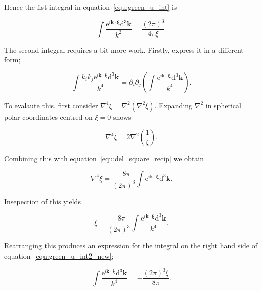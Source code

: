 \documentclass[12pt]{article}
\begin{document}
Hence the fist integral in equation~\ref{equ:green_u_int} is

\begin{equation}
\label{equ:green_u_int1}
\int \frac{\mathrm{e}^{i \boldsymbol{k} \cdot \boldsymbol{\xi}} \mathrm{d}^{3} \boldsymbol{k}}{k^{2}} = \frac{(2 \pi)^{3}}{4 \pi \xi} .
\end{equation}

The second integral requires a bit more work. Firstly, express it in a different form;

\begin{equation}
\label{equ:green_u_int2_new}
\int \frac{k_{i} k_{j} \mathrm{e}^{i \boldsymbol{k} \cdot \boldsymbol{\xi}} \mathrm{d}^{3} \boldsymbol{k}}{k^{4}} = \partial_{i} \partial_{j} \left(\int \frac{\mathrm{e}^{i \boldsymbol{k} \cdot \boldsymbol{\xi}} \mathrm{d}^{3} \boldsymbol{k}}{k^{4}} \right) .
\end{equation}

To evalaute this, first consider $\nabla^{4} \xi = \nabla^{2}(\nabla^{2} \xi)$. Expanding $\nabla^{2}$ in spherical polar coordinates centred on $\xi = 0$ shows

\begin{equation}
\label{equ:del4}
\nabla^{4} \xi = 2 \nabla^{2} \left(\frac{1}{\xi}\right) .
\end{equation}

Combining this with equation~\ref{equ:del_square_recip} we obtain

\begin{equation}
\label{equ:del4_int}
\nabla^{4} \xi = \frac{-8 \pi}{(2 \pi)^{3}} \int \mathrm{e}^{i \boldsymbol{k} \cdot \boldsymbol{\xi}} \mathrm{d}^{3} \boldsymbol{k} .
\end{equation}

Insepection of this yields

\begin{equation}
\label{equ:del4_int_int}
\xi = \frac{-8 \pi}{(2 \pi)^{3}} \int \frac{\mathrm{e}^{i \boldsymbol{k} \cdot \boldsymbol{\xi}} \mathrm{d}^{3} \boldsymbol{k}}{k^{4}} .
\end{equation}

Rearranging this produces an expression for the integral on the right hand side of equation~\ref{equ:green_u_int2_new};

\begin{equation}
\label{equ:green_u_int2_new_express}
\int \frac{\mathrm{e}^{i \boldsymbol{k} \cdot \boldsymbol{\xi}} \mathrm{d}^{3} \boldsymbol{k}}{k^{4}} = -\frac{(2 \pi)^{3} \xi}{8 \pi} .
\end{equation}
\end{document}
